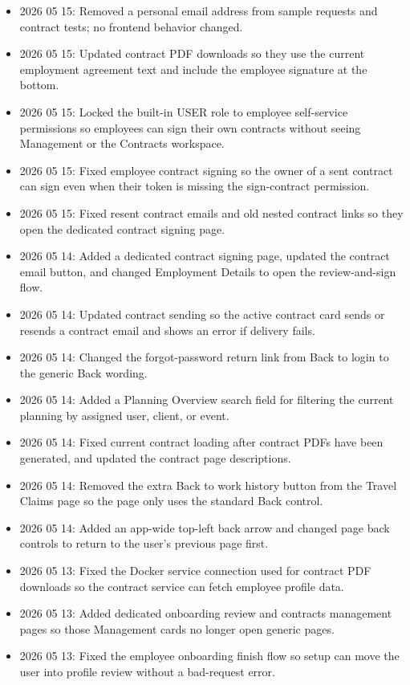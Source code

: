 \documentclass[11pt]{article}
\begin{document}
\begin{itemize}
    \item 2026 05 15: Removed a personal email address from sample requests and contract tests; no frontend behavior changed.
    \item 2026 05 15: Updated contract PDF downloads so they use the current employment agreement text and include the employee signature at the bottom.
    \item 2026 05 15: Locked the built-in USER role to employee self-service permissions so employees can sign their own contracts without seeing Management or the Contracts workspace.
    \item 2026 05 15: Fixed employee contract signing so the owner of a sent contract can sign even when their token is missing the sign-contract permission.
    \item 2026 05 15: Fixed resent contract emails and old nested contract links so they open the dedicated contract signing page.
    \item 2026 05 14: Added a dedicated contract signing page, updated the contract email button, and changed Employment Details to open the review-and-sign flow.
    \item 2026 05 14: Updated contract sending so the active contract card sends or resends a contract email and shows an error if delivery fails.
    \item 2026 05 14: Changed the forgot-password return link from Back to login to the generic Back wording.
    \item 2026 05 14: Added a Planning Overview search field for filtering the current planning by assigned user, client, or event.
    \item 2026 05 14: Fixed current contract loading after contract PDFs have been generated, and updated the contract page descriptions.
    \item 2026 05 14: Removed the extra Back to work history button from the Travel Claims page so the page only uses the standard Back control.
    \item 2026 05 14: Added an app-wide top-left back arrow and changed page back controls to return to the user's previous page first.
    \item 2026 05 13: Fixed the Docker service connection used for contract PDF downloads so the contract service can fetch employee profile data.
    \item 2026 05 13: Added dedicated onboarding review and contracts management pages so those Management cards no longer open generic pages.
    \item 2026 05 13: Fixed the employee onboarding finish flow so setup can move the user into profile review without a bad-request error.

\end{itemize}
\end{document}
